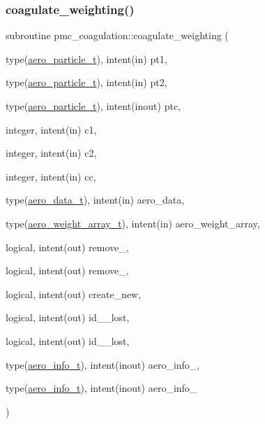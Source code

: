 \mbox{\label{namespacepmc__coagulation_a5cc62e6e5a1af2843681d766563f6364}} 
\subsubsection{\texorpdfstring{coagulate\+\_\+weighting()}{coagulate\_weighting()}}
{\footnotesize\ttfamily subroutine pmc\+\_\+coagulation\+::coagulate\+\_\+weighting (\begin{DoxyParamCaption}\item[{type(\mbox{\hyperlink{structpmc__aero__particle_1_1aero__particle__t}{aero\+\_\+particle\+\_\+t}}), intent(in)}]{pt1,  }\item[{type(\mbox{\hyperlink{structpmc__aero__particle_1_1aero__particle__t}{aero\+\_\+particle\+\_\+t}}), intent(in)}]{pt2,  }\item[{type(\mbox{\hyperlink{structpmc__aero__particle_1_1aero__particle__t}{aero\+\_\+particle\+\_\+t}}), intent(inout)}]{ptc,  }\item[{integer, intent(in)}]{c1,  }\item[{integer, intent(in)}]{c2,  }\item[{integer, intent(in)}]{cc,  }\item[{type(\mbox{\hyperlink{structpmc__aero__data_1_1aero__data__t}{aero\+\_\+data\+\_\+t}}), intent(in)}]{aero\+\_\+data,  }\item[{type(\mbox{\hyperlink{structpmc__aero__weight__array_1_1aero__weight__array__t}{aero\+\_\+weight\+\_\+array\+\_\+t}}), intent(in)}]{aero\+\_\+weight\+\_\+array,  }\item[{logical, intent(out)}]{remove\+\_,  }\item[{logical, intent(out)}]{remove\+\_,  }\item[{logical, intent(out)}]{create\+\_\+new,  }\item[{logical, intent(out)}]{id\+\_\+\_\+lost,  }\item[{logical, intent(out)}]{id\+\_\+\_\+lost,  }\item[{type(\mbox{\hyperlink{structpmc__aero__info_1_1aero__info__t}{aero\+\_\+info\+\_\+t}}), intent(inout)}]{aero\+\_\+info\+\_,  }\item[{type(\mbox{\hyperlink{structpmc__aero__info_1_1aero__info__t}{aero\+\_\+info\+\_\+t}}), intent(inout)}]{aero\+\_\+info\+\_ }\end{DoxyParamCaption})}



